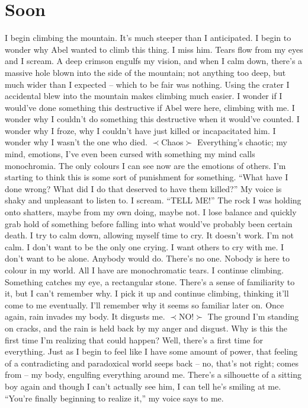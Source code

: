 \documentclass[openany, 12pt]{book}
\newcommand\tab[1][1cm]{\hspace*{#1}}
\newcommand\suck[1]{$\prec$#1$\succ$}
\begin{document}
\chapter{Soon}
\tab
I begin climbing the mountain. It’s much steeper than I anticipated. I begin to wonder why Abel wanted to climb this thing. I miss him. Tears flow from my eyes and I scream. A deep crimson engulfs my vision, and when I calm down, there’s a massive hole blown into the side of the mountain; not anything too deep, but much wider than I expected -- which to be fair was nothing.
\newline
\tab
Using the crater I accidental blew into the mountain makes climbing much easier. I wonder if I would’ve done something this destructive if Abel were here, climbing with me. I wonder why I couldn’t do something this destructive when it would’ve counted. I wonder why I froze, why I couldn’t have just killed or incapacitated him. I wonder why I wasn’t the one who died.
\newline
\suck{Chaos}
\newline
\tab
Everything’s chaotic; my mind, emotions, I’ve even been cursed with something my mind calls monochromia. The only colours I can see now are the emotions of others. I’m starting to think this is some sort of punishment for something. ``What have I done wrong? What did I do that deserved to have them killed?'' My voice is shaky and unpleasant to listen to. I scream. ``TELL ME!'' The rock I was holding onto shatters, maybe from my own doing, maybe not. I lose balance and quickly grab hold of something before falling into what would’ve probably been certain death. I try to calm down, allowing myself time to cry. It doesn’t work. I’m not calm.
\newline
\tab
I don’t want to be the only one crying. I want others to cry with me. I don’t want to be alone. Anybody would do. There’s no one. Nobody is here to colour in my world. All I have are monochromatic tears. I continue climbing. Something catches my eye, a rectangular stone. There’s a sense of familiarity to it, but I can’t remember why. I pick it up and continue climbing, thinking it’ll come to me eventually. I’ll remember why it seems so familiar later on. 
\newline
\tab
Once again, rain invades my body. It disgusts me.
\newline
\suck{NO!}
\newline
\tab
The ground I’m standing on cracks, and the rain is held back by my anger and disgust. Why is this the first time I’m realizing that could happen? Well, there’s a first time for everything. Just as I begin to feel like I have some amount of power, that feeling of a contradicting and paradoxical world seeps back -- no, that’s not right; comes from -- my body, engulfing everything around me. There’s a silhouette of a sitting boy again and though I can’t actually see him, I can tell he’s smiling at me. ``You’re finally beginning to realize it,'' my voice says to me.
\end{document}
